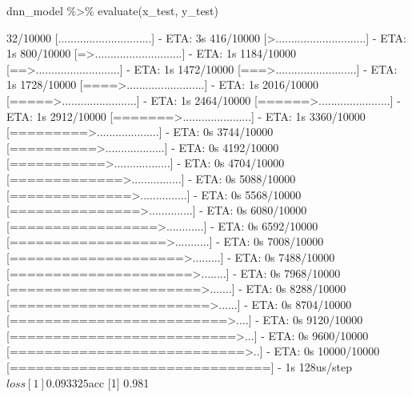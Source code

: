 \documentclass[
  12pt,
]{krantz}
\makeatletter
\newenvironment{Shaded}{\begin{snugshade}}{\end{snugshade}}
\newcommand{\FunctionTok}[1]{\textcolor[rgb]{0,0,0}{#1}}
\newcommand{\NormalTok}[1]{#1}
\newcommand{\SpecialCharTok}[1]{\textcolor[rgb]{0,0,0}{#1}}
\newenvironment{kframe}{%
\medskip{}
\setlength{\fboxsep}{.8em}
 \def\at@end@of@kframe{}%
 \ifinner\ifhmode%
  \def\at@end@of@kframe{\end{minipage}}%
  \begin{minipage}{\columnwidth}%
 \fi\fi%
 \def\FrameCommand##1{\hskip\@totalleftmargin \hskip-\fboxsep
 \colorbox{shadecolor}{##1}\hskip-\fboxsep
     \hskip-\linewidth \hskip-\@totalleftmargin \hskip\columnwidth}%
 \MakeFramed {\advance\hsize-\width
   \@totalleftmargin\z@ \linewidth\hsize
   \@setminipage}}%
 {\par\unskip\endMakeFramed%
 \at@end@of@kframe}
\renewenvironment{Shaded}{\begin{kframe}}{\end{kframe}}
\makeatother
\begin{document}
\begin{Shaded}
\begin{Highlighting}[]
\NormalTok{dnn\_model }\SpecialCharTok{\%\textgreater{}\%} \FunctionTok{evaluate}\NormalTok{(x\_test, y\_test)}
\end{Highlighting}
\end{Shaded}

\begin{Shaded}
\begin{Highlighting}[]
\NormalTok{   32/10000 [..............................] {-} ETA: 3s}
\NormalTok{  416/10000 [\textgreater{}.............................] {-} ETA: 1s}
\NormalTok{  800/10000 [=\textgreater{}............................] {-} ETA: 1s}
\NormalTok{ 1184/10000 [==\textgreater{}...........................] {-} ETA: 1s}
\NormalTok{ 1472/10000 [===\textgreater{}..........................] {-} ETA: 1s}
\NormalTok{ 1728/10000 [====\textgreater{}.........................] {-} ETA: 1s}
\NormalTok{ 2016/10000 [=====\textgreater{}........................] {-} ETA: 1s}
\NormalTok{ 2464/10000 [======\textgreater{}.......................] {-} ETA: 1s}
\NormalTok{ 2912/10000 [=======\textgreater{}......................] {-} ETA: 1s}
\NormalTok{ 3360/10000 [=========\textgreater{}....................] {-} ETA: 0s}
\NormalTok{ 3744/10000 [==========\textgreater{}...................] {-} ETA: 0s}
\NormalTok{ 4192/10000 [===========\textgreater{}..................] {-} ETA: 0s}
\NormalTok{ 4704/10000 [=============\textgreater{}................] {-} ETA: 0s}
\NormalTok{ 5088/10000 [==============\textgreater{}...............] {-} ETA: 0s}
\NormalTok{ 5568/10000 [===============\textgreater{}..............] {-} ETA: 0s}
\NormalTok{ 6080/10000 [=================\textgreater{}............] {-} ETA: 0s}
\NormalTok{ 6592/10000 [==================\textgreater{}...........] {-} ETA: 0s}
\NormalTok{ 7008/10000 [====================\textgreater{}.........] {-} ETA: 0s}
\NormalTok{ 7488/10000 [=====================\textgreater{}........] {-} ETA: 0s}
\NormalTok{ 7968/10000 [======================\textgreater{}.......] {-} ETA: 0s}
\NormalTok{ 8288/10000 [=======================\textgreater{}......] {-} ETA: 0s}
\NormalTok{ 8704/10000 [=========================\textgreater{}....] {-} ETA: 0s}
\NormalTok{ 9120/10000 [==========================\textgreater{}...] {-} ETA: 0s}
\NormalTok{ 9600/10000 [===========================\textgreater{}..] {-} ETA: 0s}
\NormalTok{10000/10000 [==============================] {-} 1s 128us/step}
\NormalTok{$loss}
\NormalTok{[1] 0.093325}

\NormalTok{$acc}
\NormalTok{[1] 0.981}
\end{Highlighting}
\end{Shaded}
\end{document}

